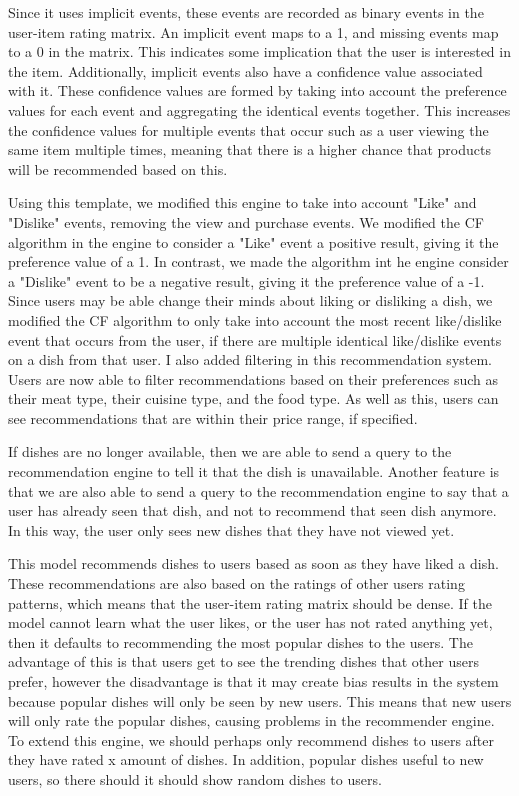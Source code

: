 Since it uses implicit events, these events are recorded as binary events in the user-item rating matrix. An implicit event maps to a 1, and missing events map to a 0 in the matrix. This indicates some implication that the user is interested in the item. Additionally, implicit events also have a confidence value associated with it. These confidence values are formed by taking into account the preference values for each event and aggregating the identical events together. This increases the confidence values for multiple events that occur such as a user viewing the same item multiple times, meaning that there is a higher chance that products will be recommended based on this. 

Using this template, we modified this engine to take into account "Like" and "Dislike" events, removing the view and purchase events. We modified the CF algorithm in the engine to consider a "Like" event a positive result, giving it the preference value of a 1. In contrast, we made the algorithm int he engine consider a "Dislike" event to be a negative result, giving it the preference value of a -1. Since users may be able change their minds about liking or disliking a dish, we modified the CF algorithm to only take into account the most recent like/dislike event that occurs from the user, if there are multiple identical like/dislike events on a dish from that user. I also added filtering in this recommendation system. Users are now able to filter recommendations based on their preferences such as their meat type, their cuisine type, and the food type. As well as this, users can see recommendations that are within their price range, if specified. 

If dishes are no longer available, then we are able to send a query to the recommendation engine to tell it that the dish is unavailable. Another feature is that we are also able to send a query to the recommendation engine to say that a user has already seen that dish, and not to recommend that seen dish anymore. In this way, the user only sees new dishes that they have not viewed yet.


This model recommends dishes to users based as soon as they have liked a dish. These recommendations are also based on the ratings of other users rating patterns, which means that the user-item rating matrix should be dense. If the model cannot learn what the user likes, or the user has not rated anything yet, then it defaults to recommending the most popular dishes to the users. The advantage of this is that users get to see the trending dishes that other users prefer, however the disadvantage is that it may create bias results in the system because popular dishes will only be seen by new users. This means that new users will only rate the popular dishes, causing problems in the recommender engine. To extend this engine, we should perhaps only recommend dishes to users after they have rated x amount of dishes. In addition, popular dishes useful to new users, so there should it should show random dishes to users. 
